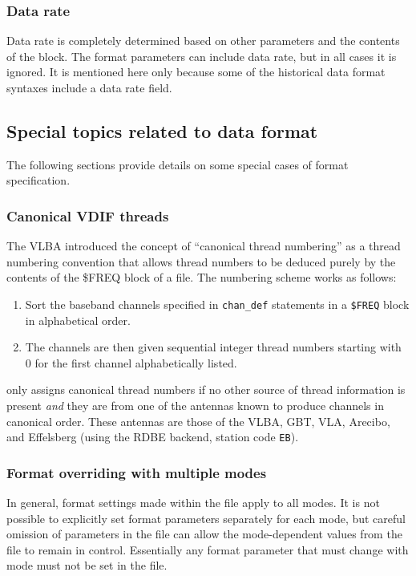 \documentclass[12pt]{article}
\begin{document}
\subsubsection{Data rate}

Data rate is completely determined based on other parameters and the contents of the  block.
The format parameters can include data rate, but in all cases it is ignored.
It is mentioned here only because some of the historical data format syntaxes include a data rate field.

\subsection{Special topics related to data format}

The following sections provide details on some special cases of format specification.

\subsubsection{Canonical VDIF threads} \label{sec:canonicalthreads}

The VLBA introduced the concept of ``canonical thread numbering'' as a thread numbering convention that allows thread numbers to be deduced purely by the contents of the {\$FREQ} block of a \vx file.
The numbering scheme works as follows:
\begin{enumerate}
\item Sort the baseband channels specified in {\tt chan\_def} statements in a {\tt \$FREQ} block in alphabetical order.
\item The channels are then given sequential integer thread numbers starting with 0 for the first channel alphabetically listed.
\end{enumerate}
\vexdifx only assigns canonical thread numbers if no other source of thread information is present {\em and} they are from one of the antennas known to produce channels in canonical order.
These antennas are those of the VLBA, GBT, VLA, Arecibo, and Effelsberg (using the RDBE backend, station code {\tt EB}).

\subsubsection{Format overriding with multiple modes}

In general, format settings made within the \vd file apply to all modes.
It is not possible to explicitly set format parameters separately for each mode, but careful omission of parameters in the \vd file can allow the mode-dependent values from the \vx file to remain in control.
Essentially any format parameter that must change with mode must not be set in the \vd file.
\end{document}
